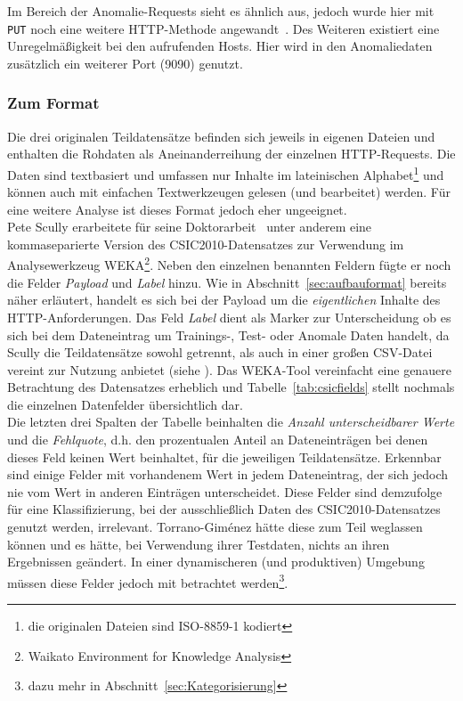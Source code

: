 

Im Bereich der Anomalie-Requests sieht es ähnlich aus, jedoch wurde hier mit \verb=PUT= noch eine weitere HTTP-Methode angewandt~\cite{csic2010}. Des Weiteren existiert eine Unregelmäßigkeit bei den aufrufenden Hosts. Hier wird in den Anomaliedaten zusätzlich ein weiterer Port (9090) genutzt. 

\subsubsection{Zum Format}

Die drei originalen Teildatensätze befinden sich jeweils in eigenen Dateien und enthalten die Rohdaten als Aneinanderreihung der einzelnen HTTP-Requests. Die Daten sind textbasiert und umfassen nur Inhalte im lateinischen Alphabet\footnote{die originalen Dateien sind ISO-8859-1 kodiert} und können auch mit einfachen Textwerkzeugen gelesen (und bearbeitet) werden. Für eine weitere Analyse ist dieses Format jedoch eher ungeeignet.\\

Pete Scully erarbeitete für seine Doktorarbeit~\cite{Scully2016} unter anderem eine kommaseparierte Version des CSIC2010-Datensatzes zur Verwendung im  Analysewerkzeug WEKA\footnote{Waikato Environment for Knowledge Analysis}. Neben den einzelnen benannten Feldern fügte er noch die Felder \emph{Payload} und \emph{Label} hinzu. Wie in Abschnitt~\ref{sec:aufbauformat} bereits näher erläutert, handelt es sich bei der Payload um die \emph{eigentlichen} Inhalte des HTTP-Anforderungen. Das Feld \emph{Label} dient als Marker zur Unterscheidung ob es sich bei dem Dateneintrag um Trainings-, Test- oder Anomale Daten handelt, da Scully die Teildatensätze sowohl getrennt, als auch in einer großen CSV-Datei vereint zur Nutzung anbietet (siehe \cite{csiccsv2010}). Das WEKA-Tool vereinfacht eine genauere Betrachtung des Datensatzes erheblich und Tabelle~\ref{tab:csicfields} stellt nochmals die einzelnen Datenfelder übersichtlich dar.\\

Die letzten drei Spalten der Tabelle beinhalten die \emph{Anzahl unterscheidbarer Werte} und die \emph{Fehlquote}, d.h. den prozentualen Anteil an Dateneinträgen bei denen dieses Feld keinen Wert beinhaltet, für die jeweiligen Teildatensätze. Erkennbar sind einige Felder mit vorhandenem Wert in jedem Dateneintrag, der sich jedoch nie vom Wert in anderen Einträgen unterscheidet. Diese Felder sind demzufolge für eine Klassifizierung, bei der ausschließlich Daten des CSIC2010-Datensatzes genutzt werden, irrelevant. Torrano-Giménez hätte diese zum Teil weglassen können und es hätte, bei Verwendung ihrer Testdaten, nichts an ihren Ergebnissen geändert. In einer dynamischeren (und produktiven) Umgebung müssen diese Felder jedoch mit betrachtet werden\footnote{dazu mehr in Abschnitt~\ref{sec:Kategorisierung}}.\\

